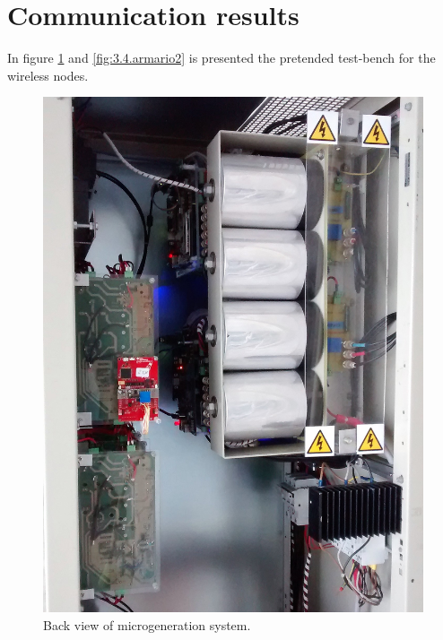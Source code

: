 \section{Communication results}
\label{sec:3.4}
In figure \ref{fig:3.4.armario1} and \ref{fig:3.4.armario2} is presented the pretended test-bench for the wireless nodes. 
\begin{figure}[!htb]
	\centering
	\begin{minipage}{.55\textwidth}
		\centering
		\includegraphics[width=0.75\linewidth,keepaspectratio]{figures/armario1}
		\caption{Back view of microgeneration system.}
		\label{fig:3.4.armario1}
	\end{minipage}%
	\begin{minipage}{0.45\textwidth}
		\centering

\end{minipage}
\end{figure}
